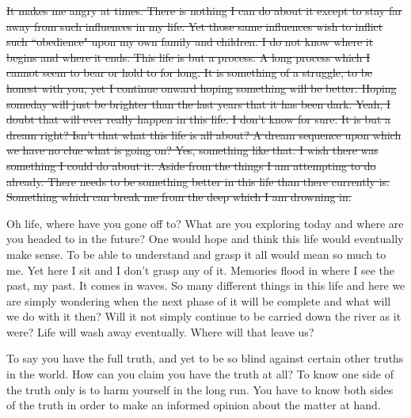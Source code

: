 \st{It makes me angry at times. There is nothing I can do about it except to 
stay far away from such influences in my life. Yet those same influences wish to 
inflict such ``obedience" upon my own family and children. I do not know where
it begins and where it ends. This life is but a process. A long process which I
cannot seem to bear or hold to for long. It is something of a struggle, to be 
honest with you, yet I continue onward hoping something will be better. Hoping
someday will just be brighter than the last years that it has been dark. Yeah,
I doubt that will ever really happen in this life. I don't know for sure. It is
but a dream right? Isn't that what this life is all about? A dream sequence upon
which we have no clue what is going on? Yes, something like that. I wish there
was something I could do about it. Aside from the things I am attempting to do
already. There needs to be something better in this life than there currently
is. Something which can break me from the deep which I am drowning in.}

Oh life, where have you gone off to? What are you exploring today and where
are you headed to in the future? One would hope and think this life would
eventually make sense. To be able to understand and grasp it all would mean so
much to me. Yet here I sit and I don't grasp any of it. Memories flood in where
I see the past, my past. It comes in waves. So many different things in this
life and here we are simply wondering when the next phase of it will be complete
and what will we do with it then? Will it not simply continue to be carried down
the river as it were? Life will wash away eventually. Where will that leave us?

To say you have the full truth, and yet to be so blind against certain other
truths in the world. How can you claim you have the truth at all? To know one
side of the truth only is to harm yourself in the long run. You have to know
both sides of the truth in order to make an informed opinion about the matter at
hand.
